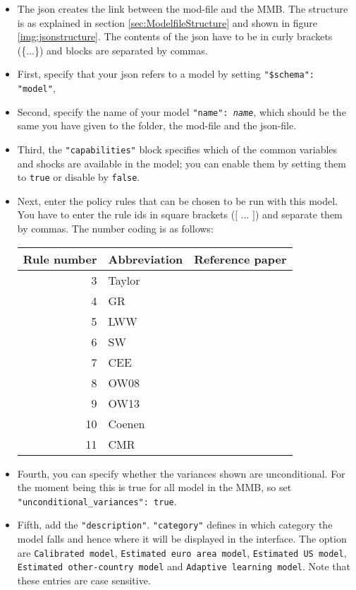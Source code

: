 \begin{itemize}
\item The json creates the link between the mod-file and the MMB. The structure is as explained in section \ref{sec:ModelfileStructure} and shown in figure \ref{img:jsonstructure}. The contents of the json have to be in curly brackets (\{...\}) and blocks are separated by commas.
\item First, specify that your json refers to a model by setting \texttt{"\$schema": "model"},
\item Second, specify the name of your model \texttt{"name": \textit{name}}, which should be the same you have given to the folder, the mod-file and the json-file.
\item Third, the \texttt{"capabilities"} block specifies which of the common variables and shocks are available in the model; you can enable them by setting them to \texttt{true} or disable by \texttt{false}.
\item Next, enter the policy rules that can be chosen to be run with this model. You have to enter the rule ids in square brackets ($[$ ... $]$) and separate them by commas. The number coding is as follows:
	\begin{table}[H]
	\centering
	\begin{tabular}{rll}
		Rule number & Abbreviation & Reference paper\\
		\hline
		 3 & Taylor & \cite{Taylor1993}\\
		 4 & GR & \cite{GerdesmeierRoffia2004}\\
		 5 & LWW & \cite{LevinWielandWilliams2003}\\
		 6 & SW & \cite{SmetsWouters2007}\\
		 7 &  CEE & \cite{ChristianoEichenbaumEvans2005}\\
		 8 & OW08 & \cite{OrphanidesWieland2008}\\
		 9 & OW13 & \cite{OrphanidesWieland2013}\\
		 10 & Coenen & \citet{Coenenetal2012}\\
		 11 & CMR & \cite{CMR2014}\\		 
	\end{tabular}
	\end{table}
\item Fourth, you can specify whether the variances shown are unconditional. For the moment being this is true for all model in the MMB, so set \texttt{"unconditional\_variances": true}.
\item Fifth, add the \texttt{"description"}. \texttt{"category"} defines in which category the model falls and hence where it will be displayed in the interface. The option are \texttt{Calibrated model}, \texttt{Estimated euro area model}, \texttt{Estimated US model}, \texttt{Estimated other-country model} and \texttt{Adaptive learning model}. Note that these entries are case sensitive.

\end{itemize}
